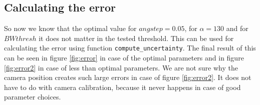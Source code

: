 \documentclass[a4paper, 20pt]{article}
\begin{document}
\begin{figure}[!ht]
\centering
\begin{floatrow}
  
\end{floatrow}
\end{figure}

\FloatBarrier


\subsection{Calculating the error}
So now we know that the optimal value for $angstep = 0.05$, for $\alpha = 130$
and for $BWthresh$ it does not matter in the tested threshold. This can be used for calculating the
error using function \texttt{compute\_uncertainty}. The final result of this
can be seen in figure \ref{fig:error} in case of the optimal parameters
and in figure \ref{fig:error2} in case of less than optimal parameters.
We are not sure why the camera position creates such large errors in case of
figure \ref{fig:error2}. It does not have to do with camera
calibration,
because it never happens in case of good parameter choices.
\end{document}
